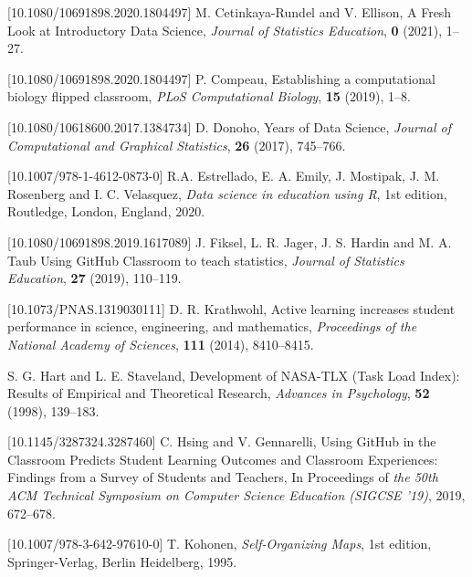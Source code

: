 \documentclass{aims}
\theoremstyle{definition}
\begin{document}
\begin{thebibliography}{99}
 [10.1080/10691898.2020.1804497]
     \newblock  M. Cetinkaya-Rundel and V. Ellison,
     \newblock A Fresh Look at Introductory Data Science,
     \newblock \emph{Journal of Statistics Education}, \textbf{0} (2021), 1--27.

 [10.1080/10691898.2020.1804497]
     \newblock P. Compeau,
     \newblock Establishing a computational biology flipped classroom,
     \newblock \emph{PLoS Computational Biology}, \textbf{15} (2019), 1--8.

 [10.1080/10618600.2017.1384734]
     \newblock  D. Donoho,
      Years of Data Science,
     \newblock \emph{Journal of Computational and Graphical Statistics}, \textbf{26} (2017), 745--766.

 [10.1007/978-1-4612-0873-0]
     \newblock R.A. Estrellado, E. A. Emily, J. Mostipak, J. M. Rosenberg and I. C. Velasquez,
     \newblock \emph{Data science in education using R},
     \newblock 1st edition, Routledge, London, England, 2020.

 [10.1080/10691898.2019.1617089]
     \newblock J. Fiksel, L. R. Jager, J. S. Hardin and M. A. Taub
     \newblock Using GitHub Classroom to teach statistics,
     \newblock \emph{Journal of Statistics Education}, \textbf{27} (2019), 110--119.

 [10.1073/PNAS.1319030111]
     \newblock  D. R. Krathwohl,
     \newblock Active learning increases student performance in science, engineering, and mathematics,
     \newblock \emph{Proceedings of the National Academy of Sciences}, \textbf{111} (2014), 8410--8415.

     \newblock S. G. Hart and L. E. Staveland,
     \newblock Development of NASA-TLX (Task Load Index): Results of Empirical and Theoretical Research,
     \newblock \emph{Advances in Psychology}, \textbf{52} (1998), 139--183.

 [10.1145/3287324.3287460]
     \newblock C. Hsing and V. Gennarelli,
     \newblock Using GitHub in the Classroom Predicts Student Learning Outcomes and Classroom Experiences: Findings from a Survey of Students and Teachers,
     \newblock In Proceedings of \emph{the 50th ACM Technical Symposium on Computer Science Education (SIGCSE '19)}, 2019, 672–678.

 [10.1007/978-3-642-97610-0]
     \newblock T.  Kohonen,
     \newblock \emph{Self-Organizing Maps},
     \newblock 1st edition, Springer-Verlag, Berlin Heidelberg, 1995.


\end{thebibliography}
\end{document}
